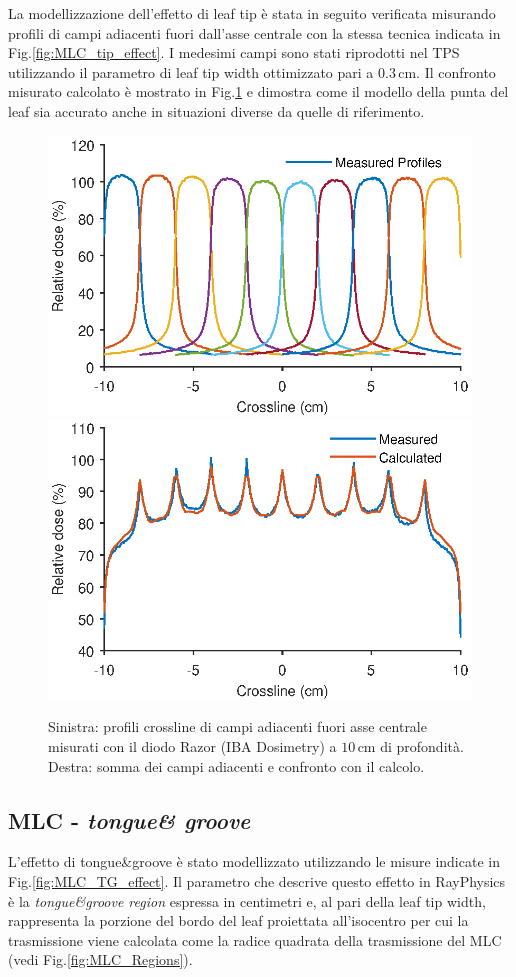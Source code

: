 La modellizzazione dell'effetto di leaf tip è stata in seguito verificata misurando profili di campi adiacenti fuori dall'asse centrale con la stessa tecnica indicata in Fig.\ref{fig:MLC_tip_effect}. I medesimi campi sono stati riprodotti nel TPS utilizzando il parametro di leaf tip width ottimizzato pari a $0.3\,$cm. Il confronto misurato calcolato è mostrato in Fig.\ref{fig:MLC_tip_model_offaxis} e dimostra come il modello della punta del leaf sia accurato anche in situazioni diverse da quelle di riferimento.
\begin{figure}
\centering
\includegraphics[width=.49\textwidth]{./cap2/MLC_Plots/Abutted/PlotMLC_Tip_modeling_offaxis.eps}
\includegraphics[width=.49\textwidth]{./cap2/MLC_Plots/Abutted/PlotMLC_Tip_modeling_offaxisSUM.eps}
\caption{Sinistra: profili crossline di campi adiacenti fuori asse centrale misurati con il diodo Razor (IBA Dosimetry) a $10\,$cm di profondità. Destra: somma dei campi adiacenti e confronto con il calcolo.}
\label{fig:MLC_tip_model_offaxis}
\end{figure}


\subsection{MLC - \textit{tongue\& groove}}
L'effetto di tongue\&{}groove è stato modellizzato utilizzando le misure indicate in Fig.\ref{fig:MLC_TG_effect}. Il parametro che descrive questo effetto in RayPhysics è la \textit{tongue\&{}groove region} espressa in centimetri e, al pari della leaf tip width, rappresenta la porzione del bordo del leaf proiettata all'isocentro per cui la trasmissione viene calcolata come la radice quadrata della trasmissione del MLC (vedi Fig.\ref{fig:MLC_Regions}).

